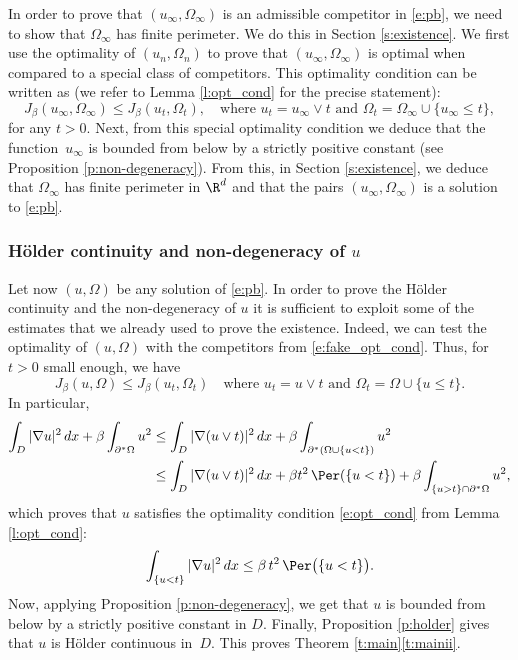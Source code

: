 In order to prove that $(u_\infty,\Omega_\infty)$ is an admissible competitor in \eqref{e:pb}, we need to show that $\Omega_\infty$ has finite perimeter. We do this in Section \ref{s:existence}.
We first use the optimality of $(u_n,\Omega_n)$ to prove that $(u_\infty,\Omega_\infty)$ is optimal when compared to a special class of competitors. This optimality condition can be written as (we refer to Lemma \ref{l:opt_cond} for the precise statement):
\begin{equation}\label{e:fake_opt_cond}
J_\beta(u_\infty,\Omega_\infty)\le J_\beta(u_t,\Omega_t),\quad\text{where $u_t=u_\infty\vee t$ and $\Omega_t=\Omega_\infty\cup \{u_\infty\le t\}$},
\end{equation}
for any $t>0$. Next, from this special optimality condition we deduce that the function~$u_\infty$ is bounded from below by a strictly positive constant (see Proposition \ref{p:non-degeneracy}). From this, in Section \ref{s:existence}, we deduce that $\Omega_\infty$ has finite perimeter in $\R^d$ and that the pairs $(u_\infty,\Omega_\infty)$ is a solution to \eqref{e:pb}.

\subsubsection{Hölder continuity and non-degeneracy of $u$} Let now $(u,\Omega)$ be any solution of \eqref{e:pb}. In order to prove the Hölder continuity and the non-degeneracy of $u$ it is sufficient to exploit some of the estimates that we already used to prove the existence. Indeed, we can test the optimality of $(u,\Omega)$ with the competitors from \eqref{e:fake_opt_cond}. Thus, for $t>0$ small enough, we have
\begin{equation}%
J_\beta(u,\Omega)\le J_\beta(u_t,\Omega_t)\quad\text{where $u_t=u\vee t$ and $\Omega_t=\Omega\cup \{u\le t\}$}.
\end{equation}
In particular,
\begin{align}
\int_{D}|\nabla u|^2\,dx+\beta\int_{\partial^\ast\Omega}u^2\notag&\le \int_{D}|\nabla (u\vee t)|^2\,dx+\beta\int_{\partial^\ast(\Omega\cup\{u<t\})}u^2\notag\\
&\le \int_{D}|\nabla (u\vee t)|^2\,dx+\beta t^2\, \Per(\{u<t\})+\beta\int_{\{u> t\}\cap \partial^\ast\Omega}u^2,\notag
\end{align}
which proves that $u$ satisfies the optimality condition \eqref{e:opt_cond} from Lemma \ref{l:opt_cond}:
\begin{equation}%
\int_{\{u<t\}}|\nabla u|^2\,dx\le \beta\, t^2\, \Per\big(\{u<t\}\big).
\end{equation}
Now, applying Proposition \ref{p:non-degeneracy}, we get that $u$ is bounded from below by a strictly positive constant in $D$. Finally, Proposition \ref{p:holder} gives that $u$ is Hölder continuous in~$D$. This proves Theorem \ref{t:main}\eqref{t:mainii}.

